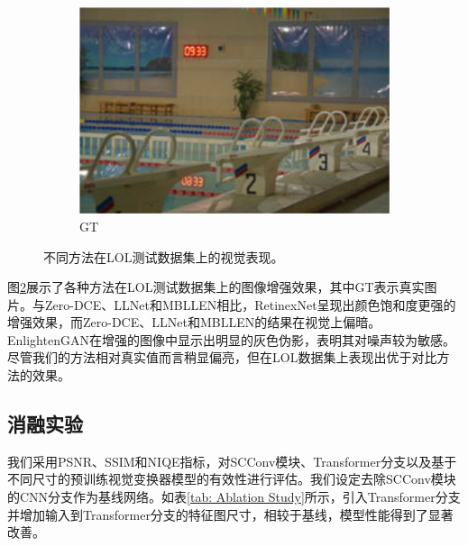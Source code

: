 \documentclass[a4paper]{ctexart}
\begin{document}
\begin{figure}[htb]
\begin{subfigure}{0.19\textwidth}
		\includegraphics[width=\linewidth]{picture/LLIE/Efficent/GT}
		\captionsetup{font=scriptsize}
		\caption{GT}
		\label{fig: GT}	
	\end{subfigure}
	\caption{
		\label{fig: LOL}
		不同方法在LOL测试数据集上的视觉表现。
	}
\end{figure}

图\ref{fig: LOL}展示了各种方法在LOL测试数据集上的图像增强效果，其中GT表示真实图片。与Zero-DCE、LLNet和MBLLEN相比，RetinexNet呈现出颜色饱和度更强的增强效果，而Zero-DCE、LLNet和MBLLEN的结果在视觉上偏暗。EnlightenGAN在增强的图像中显示出明显的灰色伪影，表明其对噪声较为敏感。尽管我们的方法相对真实值而言稍显偏亮，但在LOL数据集上表现出优于对比方法的效果。

\subsection{消融实验}

我们采用PSNR、SSIM和NIQE指标，对SCConv模块、Transformer分支以及基于不同尺寸的预训练视觉变换器模型的有效性进行评估。我们设定去除SCConv模块的CNN分支作为基线网络。如表\ref{tab: Ablation Study}所示，引入Transformer分支并增加输入到Transformer分支的特征图尺寸，相较于基线，模型性能得到了显著改善。
\end{document}
